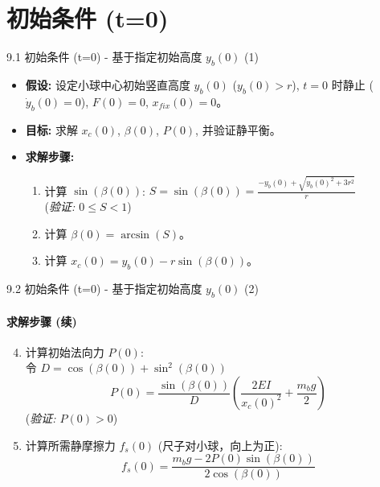 \documentclass{beamer}
\begin{document}
\section{初始条件 (t=0)}
\begin{frame}{9.1 初始条件 (t=0) - 基于指定初始高度 $y_b(0)$ (1)}
    \begin{itemize}
        \item \textbf{假设:} 设定小球中心初始竖直高度 $y_b(0)$ ($y_b(0) > r$), $t=0$ 时静止 ($\dot{y}_b(0) = 0$), $F(0)=0$, $x_{fix}(0)=0$。
        \item \textbf{目标:} 求解 $x_c(0)$, $\beta(0)$, $P(0)$, 并验证静平衡。
        \item \textbf{求解步骤:}
        \begin{enumerate}
            \item 计算 $\sin(\beta(0))$:
                $S = \sin(\beta(0)) = \frac{-y_b(0) + \sqrt{y_b(0)^2 + 3r^2}}{r}$ \\
                (\textit{验证: $0 \le S < 1$})
            \item 计算 $\beta(0) = \arcsin(S)$。
            \item 计算 $x_c(0) = y_b(0) - r \sin(\beta(0))$。
        \end{enumerate}
    \end{itemize}
\end{frame}

\begin{frame}{9.2 初始条件 (t=0) - 基于指定初始高度 $y_b(0)$ (2)}
    \framesubtitle{求解步骤 (续)}
    \begin{enumerate}
        \setcounter{enumi}{3} %
        \item 计算初始法向力 $P(0)$: \\
            令 $D = \cos(\beta(0)) + \sin^2(\beta(0))$
            \begin{equation*}
                \boxed{P(0) = \frac{\sin(\beta(0))}{ D } \left( \frac{2 EI}{x_c(0)^2} + \frac{m_b g}{2} \right)}
            \end{equation*}
            (\textit{验证: $P(0) > 0$})
        \item 计算所需静摩擦力 $f_s(0)$ (尺子对小球，向上为正):
            \begin{equation*}
                \boxed{f_s(0) = \frac{m_b g - 2 P(0) \sin(\beta(0))}{2 \cos(\beta(0))}}
            \end{equation*}
    \end{enumerate}
\end{frame}
\end{document}
